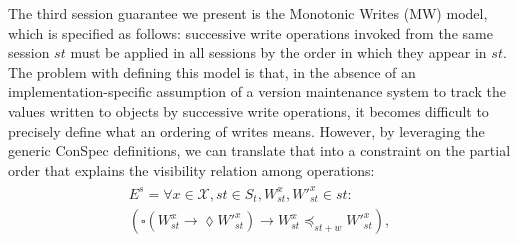 \documentclass[journal,compsoc]{IEEEtran}
\begin{document}
The third session guarantee we present is the Monotonic Writes (MW) model, which is specified as follows: successive write operations invoked from the same session $st$ must be applied in all sessions by the order in which they appear in $st$. The problem with defining this model is that, in the absence of an implementation-specific assumption of a version maintenance system to track the values written to objects by successive write operations, it becomes difficult to precisely define what an ordering of writes means. However, by leveraging the generic ConSpec definitions, we can translate that into a constraint on the partial order that explains the visibility relation among operations:
  \begin{align}\label{eqn:MW}
\begin{split}
  E^{s} =   \forall x \in \mathcal{X}, \mathit{st} \in \mathit{S_t}, W_\mathit{st}^x, W'^x_\mathit{st} \in \mathit{st}: \\ \left( \square \left( W_\mathit{st}^x \rightarrow \lozenge W'^{x}_\mathit{st} \right)  
 \rightarrow W_\mathit{st}^x \preccurlyeq_{\mathit{st}+w} W'^{x}_\mathit{st} \right), 

\end{split}
\end{align}
\end{document}
